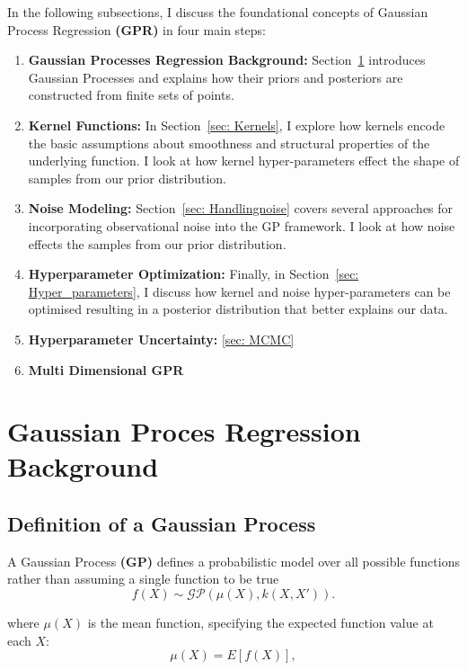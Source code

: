 \documentclass{ucdgradtaughtthesis}
\begin{document}
In the following subsections, I discuss the foundational concepts of Gaussian Process Regression \textbf{(GPR)} in four main steps:
\begin{enumerate}
    \item \textbf{Gaussian Processes Regression Background:} Section~\ref{sec: GP_backgroound} introduces Gaussian Processes and explains how their priors and posteriors are constructed from finite sets of points.
    \item \textbf{Kernel Functions:} In Section~\ref{sec: Kernels}, I explore how kernels encode the basic assumptions about smoothness and structural properties of the underlying function. I look at how kernel hyper-parameters effect the shape of samples from our prior distribution.
    \item \textbf{Noise Modeling:} Section~\ref{sec: Handlingnoise} covers several approaches for incorporating observational noise into the GP framework. I look at how noise effects the samples from our prior distribution.
    \item \textbf{Hyperparameter Optimization:} Finally, in Section~\ref{sec: Hyper_parameters}, I discuss how kernel and noise hyper-parameters can be optimised resulting in a posterior distribution that better explains our data.
    \item \textbf{Hyperparameter Uncertainty:} \ref{sec: MCMC}
    \item \textbf{Multi Dimensional GPR}
\end{enumerate}

\section{Gaussian Proces Regression Background}
\label{sec: GP_backgroound}
\subsection{Definition of a Gaussian Process}
\label{sec: Definition_of_GP}

A Gaussian Process \textbf{(GP)} defines a probabilistic model over all possible functions rather than assuming a single function to be true
\begin{equation}
f(X) \sim \mathcal{GP} (\mu(X), k(X, X')).
\label{eq: Initial_GP_distribution}
\end{equation}

\noindent
where \( \mu(X) \) is the mean function, specifying the expected function value at each \( X \):
\begin{equation}
    \mu(X) = {E}[f(X)],
    \label{eq: meandef}
\end{equation}
\end{document}
